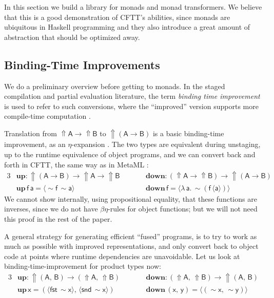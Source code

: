 \documentclass[acmsmall]{acmart}
\newcommand{\msf}[1]{{\mathsf{#1}}}
\newcommand{\mbf}[1]{{\mathbf{#1}}}
\newcommand{\bs}[1]{\boldsymbol{#1}}
\newcommand{\ind}{\hspace{1em}}
\newcommand{\lam}{\lambda\,}
\newcommand{\vA}{\mathsf{A}}
\newcommand{\vB}{\mathsf{B}}
\newcommand{\va}{\mathsf{a}}
\newcommand{\vx}{\mathsf{x}}
\newcommand{\vy}{\mathsf{y}}
\newcommand{\vf}{\mathsf{f}}
\newcommand{\Up}{{\Uparrow}}
\newcommand{\spl}{{\bs{\sim}}}
\newcommand{\ql}{{\bs{\langle}}}
\newcommand{\qr}{{\bs{\rangle}}}
\newcommand{\fst}{\msf{fst}}
\newcommand{\snd}{\msf{snd}}
\theoremstyle{remark}
\newcommand{\mup}{\mbf{up}}
\newcommand{\mdown}{\mbf{down}}
\newcommand{\qt}[1]{\ql#1\qr}
\begin{document}
In this section we build a library for monads and monad transformers. We believe
that this is a good demonstration of CFTT's abilities, since monads are
ubiquitous in Haskell programming and they also introduce a great amount of
abstraction that should be optimized away.

\subsection{Binding-Time Improvements}\label{sec:binding-time-improvements}

We do a preliminary overview before getting to monads. In the staged compilation
and partial evaluation literature, the term \emph{binding time improvement} is
used to refer to such conversions, where the ``improved'' version supports more
compile-time computation \cite[Chapter 12]{partial-evaluation}.

Translation from $\Up \vA \to \Up \vB$ to $\Up(\vA \to \vB)$ is a basic
binding-time improvement, as an $\eta$-expansion \cite{eta-expansion-trick}. The
two types are equivalent during unstaging, up to the runtime equivalence of
object programs, and we can convert back and forth in CFTT, the same way as in
MetaML \cite[Section 9]{metaml}:
\begin{alignat*}{3}
  &\mup : \Up (\vA \to \vB) \to \Up \vA \to \Up \vB && \ind\ind \mdown : (\Up \vA \to \Up \vB) \to \Up (\vA \to \vB) \\
  &\mup\,\vf\,\va = \ql \spl \vf\, \spl \va\qr   && \ind\ind \mdown\,\vf = \ql \lam \va.\,\spl(\vf\,\ql \va \qr) \qr
\end{alignat*}
We cannot show internally, using propositional equality, that these functions are
inverses, since we do not have $\beta\eta$-rules for object functions; but we
will not need this proof in the rest of the paper.

 A general strategy for generating efficient ``fused''
programs, is to try to work as much as possible with improved representations,
and only convert back to object code at points where runtime dependencies are
unavoidable. Let us look at binding-time-improvement for product types now:
\begin{alignat*}{3}
  &\mup : \Up (\vA,\,\vB) \to (\Up \vA,\,\Up \vB) && \ind\ind \mdown : (\Up \vA,\,\Up \vB) \to \Up(\vA,\,\vB) \\
  &\mup\,\vx = (\qt{\fst\,\spl \vx},\, \qt{\snd\,\spl \vx})   && \ind\ind \mdown\,(\vx,\,\vy) = \qt{(\spl \vx,\,\spl \vy)}
\end{alignat*}
\end{document}
